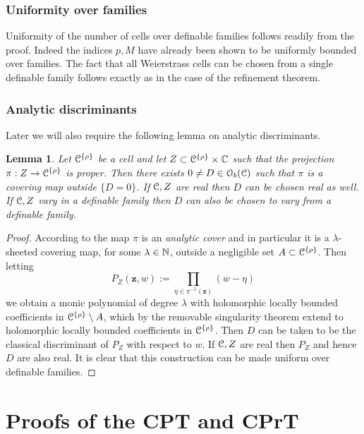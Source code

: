 \documentclass[reqno]{amsart}
\newtheorem{Lem}[Cor]{Lemma}{\bfseries}{\itshape}
\renewcommand\~[1]{\widetilde{#1}}
\def\cO{{\mathcal O}}
\def\vz{{\mathbf z}}
\def\he#1{{\{#1\}}}
\def\hrho{{\he\rho}}
\begin{document}
\subsubsection{Uniformity over families}

Uniformity of the number of cells over definable families follows
readily from the proof. Indeed the indices $p,M$ have already been
shown to be uniformly bounded over families. The fact that all
Weierstrass cells can be chosen from a single definable family follows
exactly as in the case of the refinement theorem.

\subsubsection{Analytic discriminants}

Later we will also require the following lemma on analytic
discriminants.

\begin{Lem}\label{lem:discriminant-analytic}
  Let $\cC^\hrho$ be a cell and let $Z\subset\cC^\hrho\times\C$ such
  that the projection $\pi:Z\to\cC^\hrho$ is proper. Then there exists
  $0\neq D\in\cO_b(\cC)$ such that $\pi$ is a covering map outside
  $\{D=0\}$. If ${\mathcal C},Z$ are real then $D$ can be chosen real as
  well. If ${\mathcal C},Z$ vary in a definable family then $D$ can also be
  chosen to vary from a definable family.
\end{Lem}
\begin{proof}
  According to \cite[Theorem~III.21]{gr:analytic} the map $\pi$ is an
  \emph{analytic cover} and in particular it is a $\lambda$-sheeted
  covering map, for some $\lambda\in{\mathbb N}$, outside a negligible set
  $A\subset\cC^\hrho$. Then letting
  \begin{equation}
    P_Z(\vz,w) := \prod_{\eta\in\pi^{-1}(\vz)} (w-\eta)
  \end{equation}
  we obtain a monic polynomial of degree $\lambda$ with holomorphic
  locally bounded coefficients in $\cC^\hrho\setminus A$, which by the
  removable singularity theorem extend to holomorphic locally bounded
  coefficients in $\cC^\hrho$. Then $D$ can be taken to be the
  classical discriminant of $P_Z$ with respect to $w$. If ${\mathcal C},Z$ are
  real then $P_Z$ and hence $D$ are also real. It is clear that this
  construction can be made uniform over definable families.
\end{proof}


\section{Proofs of the CPT and CPrT}
\end{document}
